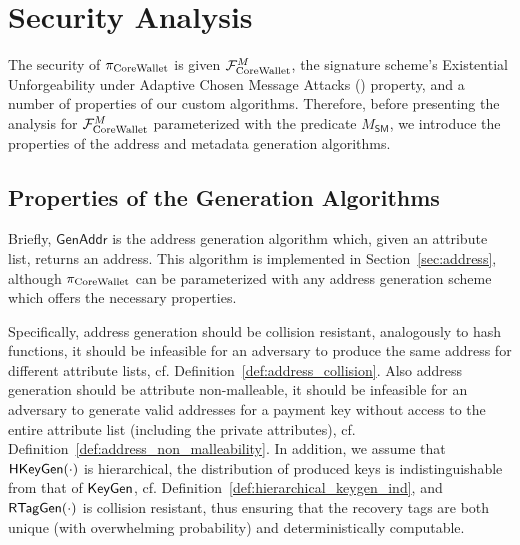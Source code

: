\section{Security Analysis}

The security of $\pi_\mathrm{CoreWallet}$ is given \wrt $\mathcal{F}_\mathrm{CoreWallet}^{M}$, the signature scheme's
Existential Unforgeability under Adaptive Chosen Message Attacks (\eufcma)
property, and a number of properties of our custom algorithms. Therefore,
before presenting the analysis for $\mathcal{F}_\mathrm{CoreWallet}^{M}$ parameterized with the
predicate $M_{\mathsf{SM}}$, we introduce the properties of the address and
metadata generation algorithms.

\subsection{Properties of  the Generation Algorithms}\label{subsec:addrgen_properties}

Briefly, $\mathsf{GenAddr}$ is the address generation algorithm which, given an
attribute list, returns an address. This algorithm is implemented in
Section~\ref{sec:address}, although $\pi_\mathrm{CoreWallet}$ can be parameterized with any
address generation scheme which offers the necessary properties.

Specifically, address generation should be collision resistant, \ie analogously
to hash functions, it should be infeasible for an adversary to produce the same
address for different attribute lists, cf.
Definition~\ref{def:address_collision}. Also address generation should be
attribute non-malleable, \ie it should be infeasible for an adversary to
generate valid addresses for a payment key without access to the entire
attribute list (including the private attributes), cf.
Definition~\ref{def:address_non_malleability}. In addition, we assume that
$\mathsf{HKeyGen}(\cdot)$ is hierarchical, \ie the distribution of
produced keys is indistinguishable from that of $\mathsf{KeyGen}$, cf.
Definition~\ref{def:hierarchical_keygen_ind}, and $\mathsf{RTagGen}(\cdot)$
is collision resistant, thus ensuring that the recovery tags are both unique
(with overwhelming probability) and deterministically computable.


